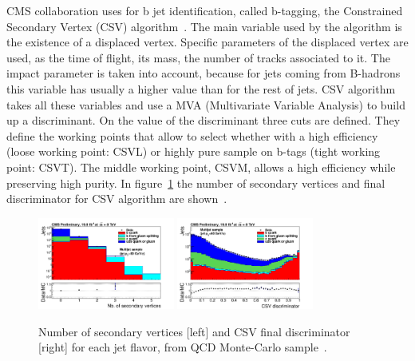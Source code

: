 %
CMS collaboration uses for b jet identification, called b-tagging, the Constrained Secondary Vertex (CSV) algorithm~\cite{Chatrchyan:2012jua, CMS-PAS-BTV-13-001}. The main variable used by the algorithm is the existence of a displaced vertex. Specific parameters of the displaced vertex are used, as the time of flight, its mass, the number of tracks associated to it. The impact parameter is taken into account, because for jets coming from B-hadrons this variable has usually a higher value than for the rest of jets. CSV algorithm takes all these variables and use a MVA (Multivariate Variable Analysis) to build up a discriminant. On the value of the discriminant three cuts are defined. They define the working points that allow to select whether with a high efficiency (loose working point: CSVL) or highly pure sample on b-tags (tight working point: CSVT). The middle working point, CSVM, allows a high efficiency while preserving high purity. In figure~\ref{fig:CSVVar} the number of secondary vertices and final discriminator for CSV algorithm are shown~\cite{CMS-PAS-BTV-13-001}.

\begin{figure}[!Hhtbp]
  \begin{center}
    \includegraphics[width=0.4\textwidth]{figs/sv_multi_0_Log.png}
    \includegraphics[width=0.4\textwidth]{figs/pdf-sub.png}
    \caption{Number of secondary vertices [left] and CSV final discriminator [right] for each jet flavor, from QCD Monte-Carlo sample~\cite{CMS-PAS-BTV-13-001}.}
    \label{fig:CSVVar}
  \end{center}
\end{figure}

